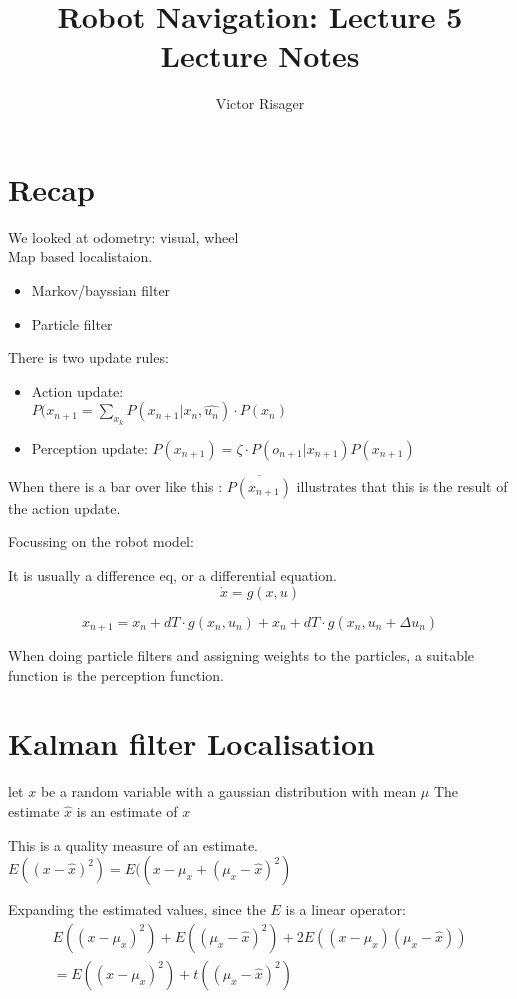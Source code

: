 \documentclass[a4paper]{article}
\title{Robot Navigation: Lecture 5 \\
	\large Lecture Notes}
\author{Victor Risager}
\begin{document}
\maketitle

\section{Recap}
We looked at odometry: visual, wheel\\
Map based localistaion.
\begin{itemize}
	\item Markov/bayssian filter
	\item Particle filter
\end{itemize}


There is two update rules:

\begin{itemize}
	\item Action update: \\
		$ P(x_{n+1} = \sum_{x_k}^{}{P(x_{n+1} | x_n, \hat{u_n}) \cdot P(x_n)} $
	\item Perception update:
		$ P(x_{n+1}) = \zeta \cdot P(o_{n+1} | x_{n+1} ) P(x_{n+1}) $
\end{itemize}

When there is a bar over like this : $ \overline{P(x_{n+1})} $ illustrates that this is the result of the action update. 


Focussing on the robot model:

It is usually a difference eq, or a differential equation.
\[
\dot{x} = g(x,u)
\] 

\[
	x_{n+1} = x_n + dT \cdot g(x_n,u_n) + x_n + dT \cdot g(x_n, \hat{u_n} + \Delta u_n) 
\] 


When doing particle filters and assigning weights to the particles, a suitable function is the perception function. 


\section{Kalman filter Localisation}

let $ x $ be a random variable with a gaussian distribution with mean  $ \mu $
The estimate $ \hat{x} $ is an estimate of $ x $

This is a quality measure of an estimate.  
$ E((x-\hat{x})^{2}) = E((x-\mu_x + (\mu_x - \hat{x})^{2}) $

Expanding the estimated values, since the $ E $ is a linear operator:
\centering
\[
\begin{split}
E((x-\mu_x)^{2} )+ E((\mu_x -\hat{x})^{2}) +2 E((x-\mu_x)(\mu_x -\hat{x})) \\ = E((x-\mu_x)^{2}) + t((\mu_x - \hat{x})^{2} )
\end{split}
\]
\end{document}
